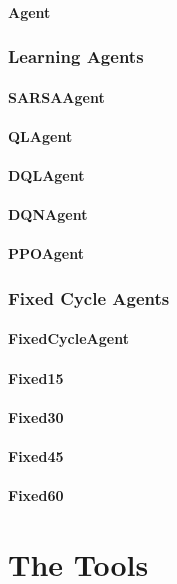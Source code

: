 \paragraph{Agent}

\subsubsection{Learning Agents}

\paragraph{SARSAAgent}
\paragraph{QLAgent}
\paragraph{DQLAgent}
\paragraph{DQNAgent}
\paragraph{PPOAgent}

\subsubsection{Fixed Cycle Agents}

\paragraph{FixedCycleAgent}
\paragraph{Fixed15}
\paragraph{Fixed30}
\paragraph{Fixed45}
\paragraph{Fixed60}

\section{The Tools}

